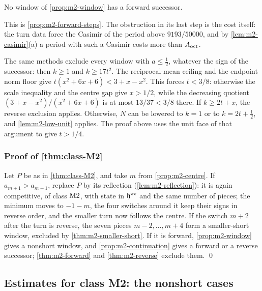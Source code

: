 \begin{theorem}\label{thm:m2-forward}
No window of \cref{prop:m2-window} has a forward successor.
\end{theorem}

This is \cref{prop:m2-forward-steps}. The obstruction in its last step is the cost itself: the turn
data force the Casimir of the period above $9193/50000$, and by \cref{lem:m2-casimir}(a) a period
with such a Casimir costs more than $A_{\mathrm{oct}}$.

\begin{remark}\label{rem:m2-low-scale}
The same methods exclude every window with $a\le\frac12$, whatever the sign of the successor:
then $k\ge1$ and $k\ge17t^2$. The reciprocal-mean ceiling and the endpoint norm floor give
$t(x^2+6x+6)<3+x-x^2$. This forces $t<3/8$: otherwise the scale inequality
and the centre gap give $x>1/2$, while the decreasing quotient
$(3+x-x^2)/(x^2+6x+6)$ is at most $13/37<3/8$ there.
If $k\ge2t+x$, the reverse exclusion applies. Otherwise,
$N$ can be lowered to $k=1$ or to $k=2t+\frac12$, and \cref{lem:m2-low-unit} applies.
The proof above uses the unit face of that argument to give $t>1/4$.
\end{remark}


\subsubsection{Proof of \texorpdfstring{\cref{thm:class-M2}}{the theorem for class M2}}\label{sec:m2-proof}

Let $P$ be as in \cref{thm:class-M2}, and take $m$ from \cref{prop:m2-centre}. If $a_{m+1}>a_{m-1}$,
replace $P$ by its reflection (\cref{lem:m2-reflection}): it is again competitive, of class
$\mathrm{M2}$, with state in $\mathfrak{h}^{\star\star}$ and the same number of pieces; the minimum moves to $-1-m$,
the four switches around it keep their signs in reverse order, and the smaller turn now follows the
centre. If the switch $m+2$ after the turn is reverse, the seven pieces $m-2,\dots,m+4$ form a
smaller-short window, excluded by \cref{thm:m2-smaller-short}. If it is forward, \cref{prop:m2-window} gives a nonshort window,
and \cref{prop:m2-continuation} gives a forward or a reverse successor; \cref{thm:m2-forward}
and \cref{thm:m2-reverse} exclude them. \qed

\subsection{Estimates for class M2: the nonshort cases}\label{app:nonshort-estimates}

